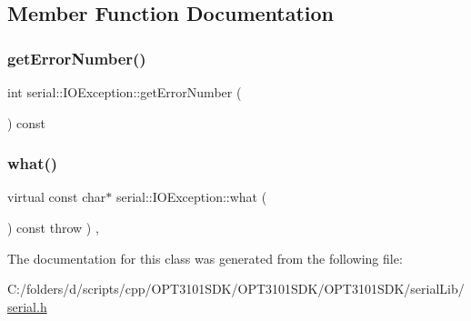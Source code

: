 \subsection{Member Function Documentation}
\mbox{\label{classserial_1_1_i_o_exception_af6b35e13d3d212ab2f7ecbb28a231de4}} 
\subsubsection{\texorpdfstring{get\+Error\+Number()}{getErrorNumber()}}
{\footnotesize\ttfamily int serial\+::\+I\+O\+Exception\+::get\+Error\+Number (\begin{DoxyParamCaption}{ }\end{DoxyParamCaption}) const\hspace{0.3cm}{\ttfamily [inline]}}

\mbox{\label{classserial_1_1_i_o_exception_abd1b0ecb2f1a867ed7ade7c3f3b9dada}} 
\subsubsection{\texorpdfstring{what()}{what()}}
{\footnotesize\ttfamily virtual const char$\ast$ serial\+::\+I\+O\+Exception\+::what (\begin{DoxyParamCaption}{ }\end{DoxyParamCaption}) const throw  ) \hspace{0.3cm}{\ttfamily [inline]}, {\ttfamily [virtual]}}



The documentation for this class was generated from the following file\+:\begin{DoxyCompactItemize}
\item 
C\+:/folders/d/scripts/cpp/\+O\+P\+T3101\+S\+D\+K/\+O\+P\+T3101\+S\+D\+K/\+O\+P\+T3101\+S\+D\+K/serial\+Lib/\mbox{\hyperlink{serial_8h}{serial.\+h}}\end{DoxyCompactItemize}
